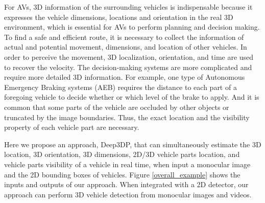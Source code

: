 \documentclass[a4paper,12pt]{article}
\begin{document}
For AVs, 3D information of the surrounding vehicles is indispensable because it expresses the vehicle dimensions, locations and orientation in the real 3D environment, which is essential for AVs to perform planning and decision making. To find a safe and efficient route, it is necessary to collect the information of actual and potential movement, dimensions, and location of other vehicles. In order to perceive the movement, 3D localization,  orientation, and time are used to recover the velocity. The decision-making systems are more complicated and require more detailed 3D information. For example, one type of Autonomous Emergency Braking systems (AEB) requires the distance to each part of a foregoing vehicle to decide whether or which level of the brake to apply. And it is common that some parts of the vehicle are occluded by other objects or truncated by the image boundaries. Thus, the exact location and the visibility property of each vehicle part are necessary.

Here we propose an approach, Deep3DP, that can simultaneously estimate the 3D location, 3D orientation, 3D dimensions, 2D/3D vehicle parts location, and vehicle parts visibility of a vehicle  in real time,  when input a monocular image and the 2D bounding boxes of vehicles. Figure \ref{overall_example} shows the inputs and outputs of our approach. When integrated with a 2D detector, our approach can perform 3D vehicle detection from monocular images and videos.
\end{document}

